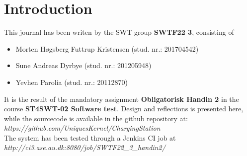 \section{Introduction}

This journal has been writen by the SWT group \textbf{SWTF22 3}, consisting of 
\begin{itemize}
\item Morten H\o gsberg Futtrup Kristensen (stud. nr.: 201704542)
\item Sune Andreas Dyrbye (stud. nr.: 201205948)
\item Yevhen Parolia (stud. nr.: 20112870)
\end{itemize}
It is the result of the mandatory assignment \textbf{Obligatorisk Handin 2} in the course \textbf{ST4SWT-02 Software test}. Design and reflections is presented here, while the sourcecode is available in the github repository at:\\
\emph{https://github.com/UniquesKernel/ChargingStation}\\

The system has been tested through a Jenkins CI job at\\
\emph{http://ci3.ase.au.dk:8080/job/SWTF22\_3\_handin2/}